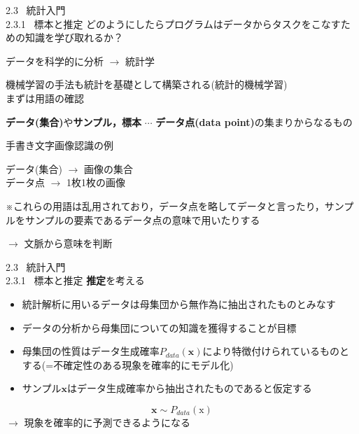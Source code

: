 \documentclass[dvipdfmx,10pt]{beamer}
\begin{document}
  \begin{frame}{2.3 \ 統計入門 \\ \normalsize{2.3.1 \ 標本と推定}}
    どのようにしたらプログラムはデータからタスクをこなすための知識を学び取れるか？\\
    \begin{center}
      データを科学的に分析 $\rightarrow$ 統計学
    \end{center}
    機械学習の手法も統計を基礎として構築される(統計的機械学習)\\
    まずは用語の確認\\
    \begin{center}
      \textbf{データ(集合)}や\textbf{サンプル，標本} $\cdots$ \textbf{データ点(data point)}の集まりからなるもの\\
    \end{center}
    \begin{exampleblock}{手書き文字画像認識の例}
      \begin{center}
        データ(集合) $\rightarrow$ 画像の集合\\
        データ点 $\rightarrow$ 1枚1枚の画像
      \end{center}
    \end{exampleblock}
    \vspace{0.2cm}
    ※これらの用語は乱用されており，データ点を略してデータと言ったり，サンプルをサンプルの要素であるデータ点の意味で用いたりする\\
    \begin{center}
      $\rightarrow$ 文脈から意味を判断
    \end{center}
  \end{frame}

  \begin{frame}[t]{2.3 \ 統計入門 \\ \normalsize{2.3.1 \ 標本と推定}}
    \textbf{推定}を考える\\
    \begin{itemize}
      \item 統計解析に用いるデータは母集団から無作為に抽出されたものとみなす
      \item データの分析から母集団についての知識を獲得することが目標
      \item 母集団の性質はデータ生成確率$P_{data}(\bm{x})$により特徴付けられているものとする(=不確定性のある現象を確率的にモデル化)
      \item サンプル$\bm{x}$はデータ生成確率から抽出されたものであると仮定する
    \end{itemize}
    \begin{equation*}
      \bm{x} \sim P_{data}(\bm{\mathrm{x}})
    \end{equation*}
    $\rightarrow$ 現象を確率的に予測できるようになる
  \end{frame}
\end{document}
